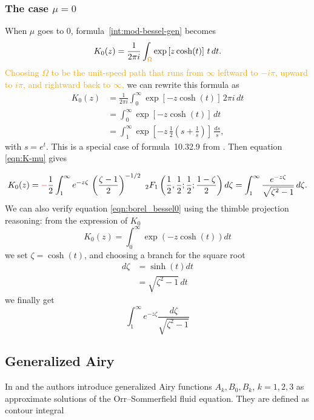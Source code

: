 \documentclass{article}
\theoremstyle{definition}
\theoremstyle{plain}
\newenvironment{verify}{\color{ForestGreen}}{\color{black}}
\begin{document}
\subsubsection{The case $\mu=0$}
When $\mu$ goes to $0$, formula~\eqref{int:mod-bessel-gen} becomes
\[ K_0(z) = \frac{1}{2\pi i} \int_ {\textcolor{orange}{\Omega}} \exp\left[z \cosh(t)\right]\,t\,dt. \]
\textcolor{orange}{Choosing $\Omega$ to be the unit-speed path that runs from $\infty$ leftward to $-i\pi$, upward to $i\pi$, and rightward back to $\infty$,} we can rewrite this formula as
\begin{align*}
K_0(z) & = \frac{1}{2\pi i} \int_0^\infty \exp\left[-z \cosh(t)\right]\,2\pi i\,dt \\
& = \int_0^\infty \exp\left[-z \cosh(t)\right]\,dt \\
& = \int_1^\infty \exp\left[-z\,\tfrac{1}{2}\left(s + \tfrac{1}{s}\right)\right]\,\frac{ds}{s},
\end{align*}
with $s = e^t$. This is a special case of formula~10.32.9 from \cite{dlmf}. Then equation \eqref{eqn:K-mu} gives

\begin{equation}\label{eqn:borel_bessel0}
    K_0(z)=\textcolor{red}{-}\frac{1}{2}\int_1^\infty e^{-z\zeta} \, \left(\frac{\zeta-1}{2}\right)^{-1/2} \,\, {}_2F_1\left(\frac{1}{2}, \frac{1}{2};\frac{1}{2};\frac{1-\zeta}{2}\right)  d\zeta =  \int_1^\infty \frac{e^{-z\zeta}}{\sqrt{\zeta^2-1}} \, d\zeta .
\end{equation}
\begin{verify}
    We can also verify equation \eqref{eqn:borel_bessel0} using the thimble projection reasoning: from the expression of $K_0$ 
    \begin{equation}
        K_0(z)=\int_0^{\infty} \exp(-z\cosh(t)) dt
    \end{equation}
    we set $\zeta=\cosh(t)$, and choosing a branch for the square root
    \begin{align*}
        d\zeta & = \sinh(t) dt\\
        & =  \sqrt{\zeta^2-1} \, dt
    \end{align*}
    we finally get 
    \[\int_1^{\infty} e^{-z\zeta} \frac{d\zeta}{\sqrt{\zeta^2-1}}\]
\end{verify}



\subsection{Generalized Airy}
In \cite{Reid} and \cite[Appendix]{drazin-reid} the authors introduce generalized Airy functions $A_k, B_0, B_k$, $k=1,2,3$ as approximate solutions of the Orr--Sommerfield fluid equation. They are defined as contour integral \cite[Section 9.13(ii)]{dlmf}
\end{document}
